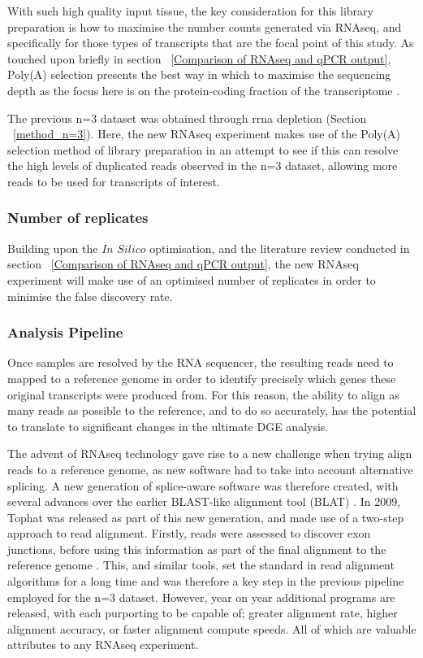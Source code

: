 With such high quality input tissue, the key consideration for this library preparation is how to maximise the number counts generated via RNAseq, and specifically for those types of transcripts that are the focal point of this study. As touched upon briefly in section ~\ref{Comparison of RNAseq and qPCR output}, Poly(A) selection presents the best way in which to maximise the sequencing depth as the focus here is on the protein-coding fraction of the transcriptome \cite{Kumar2017,Zhao2018,Guo2015}. 

The previous n=3 dataset was obtained through \acrshort{rrna} depletion (Section ~\ref{method_n=3}). Here, the new RNAseq experiment makes use of the Poly(A) selection method of library preparation in an attempt to see if this can resolve the high levels of duplicated reads observed in the n=3 dataset, allowing more reads to be used for transcripts of interest. 

\subsubsection{Number of replicates}

Building upon the $\textit{In Silico}$ optimisation, and the literature review conducted in section ~\ref{Comparison of RNAseq and qPCR output}, the new RNAseq experiment will make use of an optimised number of replicates in order to minimise the false discovery rate. 

\subsubsection{Analysis Pipeline}

Once samples are resolved by the RNA sequencer, the resulting reads need to mapped to a reference genome in order to identify precisely which genes these original transcripts were produced from. For this reason, the ability to align as many reads as possible to the reference, and to do so accurately, has the potential to translate to significant changes in the ultimate DGE analysis. 

The advent of RNAseq technology gave rise to a new challenge when trying align reads to a reference genome, as new software had to take into account alternative splicing. A new generation of splice-aware software was therefore created, with several advances over the earlier BLAST-like alignment tool (BLAT) \cite{Kent2002,Fonseca2012}. In 2009, Tophat was released as part of this new generation, and made use of a two-step approach to read alignment. Firstly, reads were assessed to discover exon junctions, before using this information as part of the final alignment to the reference genome \cite{Trapnell2009}. This, and similar tools, set the standard in read alignment algorithms for a long time and was therefore a key step in the previous pipeline employed for the n=3 dataset. However, year on year additional programs are released, with each purporting to be capable of; greater alignment rate, higher alignment accuracy, or faster alignment compute speeds. All of which are valuable attributes to any RNAseq experiment. 

